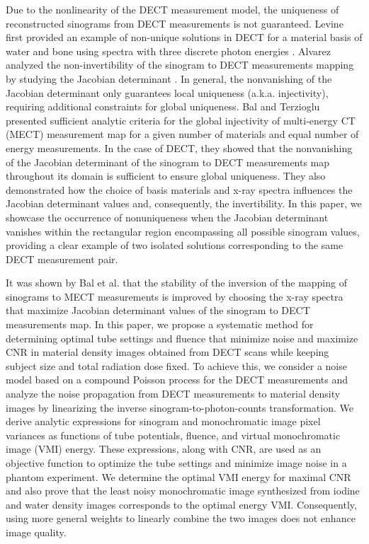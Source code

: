 \documentclass[12pt,twoside]{article}   %
\begin{document}
Due to the nonlinearity of the DECT measurement model, the uniqueness of reconstructed sinograms from DECT measurements is not guaranteed. Levine first provided an example of non-unique solutions in DECT for a material basis of water and bone using spectra with three discrete photon energies \cite{Levine}. Alvarez analyzed the non-invertibility of the sinogram to DECT measurements mapping by studying the Jacobian determinant \cite{Alvarez2019}. In general, the nonvanishing of the Jacobian determinant only guarantees local uniqueness (a.k.a. injectivity), requiring additional constraints for global uniqueness. Bal and Terzioglu\cite{BalTer20} presented sufficient analytic criteria for the global injectivity of multi-energy CT (MECT) measurement map for a given number of materials and equal number of energy measurements. In the case of DECT, they showed that the nonvanishing of the Jacobian determinant of the sinogram to DECT measurements map throughout its domain is sufficient to ensure global uniqueness. They also demonstrated how the choice of basis materials and x-ray spectra influences the Jacobian determinant values and, consequently, the invertibility. In this paper, we showcase the occurrence of nonuniqueness when the Jacobian determinant vanishes within the rectangular region encompassing all possible sinogram values, providing a clear example of two isolated solutions corresponding to the same DECT measurement pair.

It was shown by Bal et al. \cite{BalGongTer} that the stability of the inversion of the mapping of sinograms to MECT measurements is improved by choosing the x-ray spectra that maximize Jacobian determinant values of the sinogram to DECT measurements map. In this paper, we propose a systematic method for determining optimal tube settings and fluence that minimize noise and maximize CNR in material density images obtained from DECT scans while keeping subject size and total radiation dose fixed. To achieve this, we consider a noise model based on a compound Poisson process for the DECT measurements and analyze the noise propagation from DECT measurements to material density images by linearizing the inverse sinogram-to-photon-counts transformation. We derive analytic expressions for sinogram and monochromatic image pixel variances as functions of tube potentials, fluence, and virtual monochromatic image (VMI) energy. These expressions, along with CNR, are used as an objective function to optimize the tube settings and minimize image noise in a phantom experiment. We determine the optimal VMI energy for maximal CNR and also prove that the least noisy monochromatic image synthesized from iodine and water density images corresponds to the optimal energy VMI. Consequently, using more general weights to linearly combine the two images does not enhance image quality.
\end{document}

